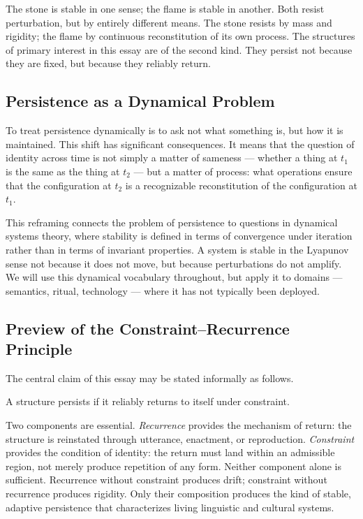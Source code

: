 \documentclass[12pt, oneside]{article}
\theoremstyle{definition}
\theoremstyle{remark}
\begin{document}
The stone is stable in one sense; the flame is stable in another.
Both resist perturbation, but by entirely different means.
The stone resists by mass and rigidity; the flame by continuous reconstitution of its own process.
The structures of primary interest in this essay are of the second kind.
They persist not because they are fixed, but because they reliably return.

\subsection{Persistence as a Dynamical Problem}

To treat persistence dynamically is to ask not what something is, but how it is maintained.
This shift has significant consequences.
It means that the question of identity across time is not simply a matter of sameness --- whether a thing at $t_{1}$ is the same as the thing at $t_{2}$ --- but a matter of process: what operations ensure that the configuration at $t_{2}$ is a recognizable reconstitution of the configuration at $t_{1}$.

This reframing connects the problem of persistence to questions in dynamical systems theory, where stability is defined in terms of convergence under iteration rather than in terms of invariant properties.
A system is stable in the Lyapunov sense not because it does not move, but because perturbations do not amplify.
We will use this dynamical vocabulary throughout, but apply it to domains --- semantics, ritual, technology --- where it has not typically been deployed.

\subsection{Preview of the Constraint--Recurrence Principle}

The central claim of this essay may be stated informally as follows.

\begin{quoting}
A structure persists if it reliably returns to itself under constraint.
\end{quoting}

Two components are essential.
\emph{Recurrence} provides the mechanism of return: the structure is reinstated through utterance, enactment, or reproduction.
\emph{Constraint} provides the condition of identity: the return must land within an admissible region, not merely produce repetition of any form.
Neither component alone is sufficient.
Recurrence without constraint produces drift; constraint without recurrence produces rigidity.
Only their composition produces the kind of stable, adaptive persistence that characterizes living linguistic and cultural systems.
\end{document}
